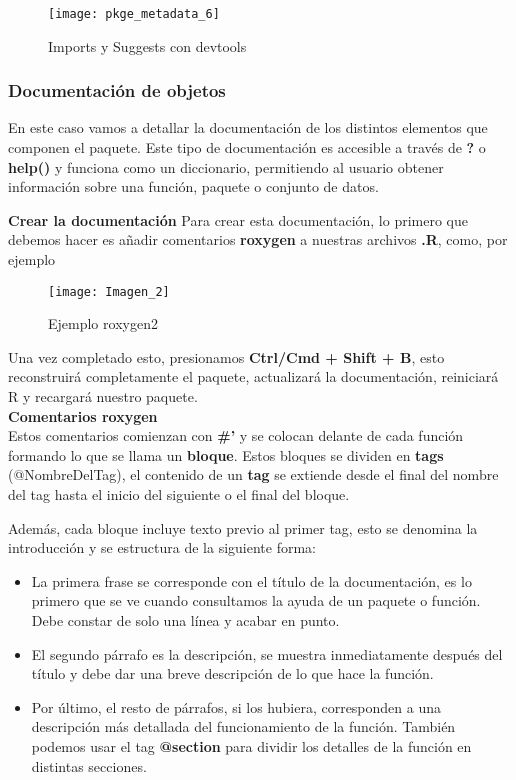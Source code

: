 \begin{figure}[H]
    \centering
    \texttt{[image: pkge\_metadata\_6]}
    \caption{Imports y Suggests con devtools }
    \label{fig:import_suggest}
\end{figure}

\subsubsection{Documentaci\'on de objetos}

En este caso vamos a detallar la documentaci\'on de los distintos elementos que componen el
paquete.
Este tipo de documentaci\'on es accesible a trav\'es de \textbf{?} o \textbf{help()} y funciona como un
diccionario, permitiendo al usuario obtener informaci\'on sobre una funci\'on, paquete o conjunto
de datos.

\textbf{Crear la documentaci\'on}
Para crear esta documentaci\'on, lo primero que debemos hacer es a\~nadir comentarios
\textbf{roxygen} a nuestras archivos \textbf{.R}, como, por ejemplo

\begin{figure}[H]
    \centering
    \texttt{[image: Imagen\_2]}
    \caption{Ejemplo roxygen2   }
    \label{fig:roxygen2}
\end{figure} 

Una vez completado esto, presionamos \textbf{Ctrl/Cmd + Shift + B}, esto reconstruir\'a
completamente el paquete, actualizar\'a la documentaci\'on, reiniciar\'a R y recargar\'a nuestro
paquete. \\

\textbf{Comentarios roxygen} \\
Estos comentarios comienzan con \textbf{\#'} y se colocan delante de cada funci\'on formando lo que
se llama un \textbf{bloque}. Estos bloques se dividen en \textbf{tags} (@NombreDelTag), el contenido de un
\textbf{tag} se extiende desde el final del nombre del tag hasta el inicio del siguiente o el final del
bloque.

Adem\'as, cada bloque incluye texto previo al primer tag, esto se denomina la introducci\'on y
se estructura de la siguiente forma:

\begin{itemize}
    \item La primera frase se corresponde con el t\'itulo de la documentaci\'on, es lo primero que
se ve cuando consultamos la ayuda de un paquete o funci\'on. Debe constar de solo
una l\'inea y acabar en punto.
    \item El segundo p\'arrafo es la descripci\'on, se muestra inmediatamente despu\'es del t\'itulo y
debe dar una breve descripci\'on de lo que hace la funci\'on.
    \item Por \'ultimo, el resto de p\'arrafos, si los hubiera, corresponden a una descripci\'on m\'as
detallada del funcionamiento de la funci\'on. Tambi\'en podemos usar el tag \textbf{@section}
para dividir los detalles de la funci\'on en distintas secciones.
\end{itemize}

